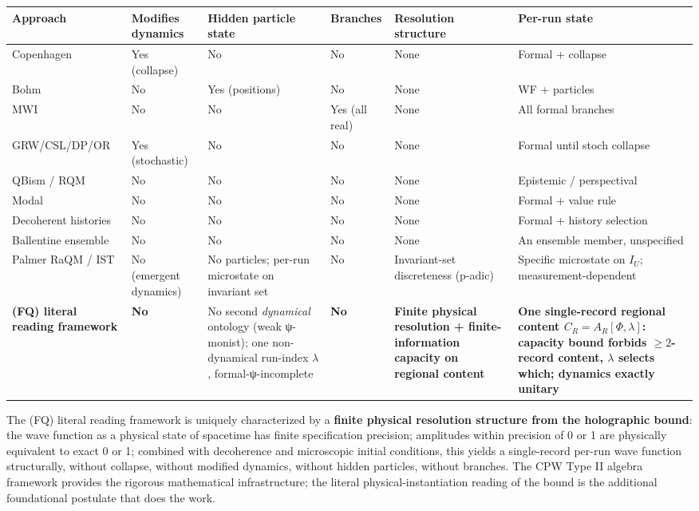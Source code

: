 \documentclass[11pt,a4paper]{article}
\begin{document}
\begin{center}
\small
\begin{tabularx}{\linewidth}{|Y|Y|Y|Y|Y|Y|}
\hline
\textbf{Approach} & \textbf{Modifies dynamics} & \textbf{Hidden particle state} & \textbf{Branches} & \textbf{Resolution structure} & \textbf{Per-run state} \\
\hline
Copenhagen & Yes (collapse) & No & No & None & Formal + collapse \\
\hline
Bohm & No & Yes (positions) & No & None & WF + particles \\
\hline
MWI & No & No & Yes (all real) & None & All formal branches \\
\hline
GRW/CSL/DP/OR & Yes (stochastic) & No & No & None & Formal until stoch collapse \\
\hline
QBism / RQM & No & No & No & None & Epistemic / perspectival \\
\hline
Modal & No & No & No & None & Formal + value rule \\
\hline
Decoherent histories & No & No & No & None & Formal + history selection \\
\hline
Ballentine ensemble & No & No & No & None & An ensemble member, unspecified \\
\hline
Palmer RaQM / IST & No (emergent dynamics) & No particles; per-run microstate on invariant set & No & Invariant-set discreteness (p-adic) & Specific microstate on $I_U$; measurement-dependent \\
\hline
\textbf{(FQ) literal reading framework} & \textbf{No} & No second \emph{dynamical} ontology (weak ψ-monist); one non-dynamical run-index $\lambda$, formal-ψ-incomplete & \textbf{No} & \textbf{Finite physical resolution + finite-information capacity on regional content} & \textbf{One single-record regional content $C_R = A_R[\Phi,\lambda]$: capacity bound forbids $\ge 2$-record content, $\lambda$ selects which; dynamics exactly unitary} \\
\hline
\end{tabularx}
\end{center}

The (FQ) literal reading framework is uniquely characterized by a \textbf{finite physical resolution structure from the holographic bound}: the wave function as a physical state of spacetime has finite specification precision; amplitudes within precision of 0 or 1 are physically equivalent to exact 0 or 1; combined with decoherence and microscopic initial conditions, this yields a single-record per-run wave function structurally, without collapse, without modified dynamics, without hidden particles, without branches. The CPW Type II algebra framework provides the rigorous mathematical infrastructure; the literal physical-instantiation reading of the bound is the additional foundational postulate that does the work.
\end{document}
